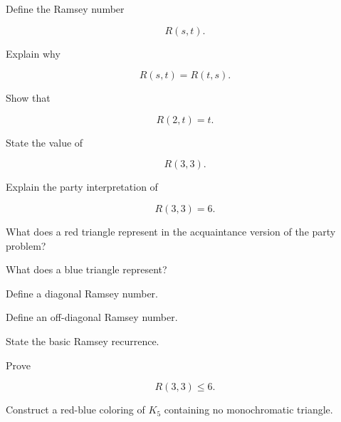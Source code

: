\begin{exercise}[1]
Define the Ramsey number

\[
R(s,t).
\]
\end{exercise}

\begin{exercise}[1]
Explain why

\[
R(s,t)=R(t,s).
\]
\end{exercise}

\begin{exercise}[1]
Show that

\[
R(2,t)=t.
\]
\end{exercise}

\begin{exercise}[1]
State the value of

\[
R(3,3).
\]
\end{exercise}

\begin{exercise}[1]
Explain the party interpretation of

\[
R(3,3)=6.
\]
\end{exercise}

\begin{exercise}[1]
What does a red triangle represent in the acquaintance version of the
party problem?
\end{exercise}

\begin{exercise}[1]
What does a blue triangle represent?
\end{exercise}

\begin{exercise}[1]
Define a diagonal Ramsey number.
\end{exercise}

\begin{exercise}[1]
Define an off-diagonal Ramsey number.
\end{exercise}

\begin{exercise}[1]
State the basic Ramsey recurrence.
\end{exercise}

\begin{exercise}[2]
Prove

\[
R(3,3)\leq6.
\]
\end{exercise}

\begin{exercise}[2]
Construct a red-blue coloring of \(K_5\) containing no monochromatic
triangle.
\end{exercise}

